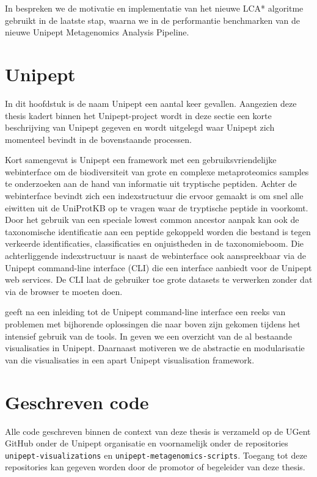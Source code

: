In  bespreken we de motivatie en implementatie van het nieuwe 
LCA* algoritme gebruikt in de laatste stap, waarna we in  
de performantie benchmarken van de nieuwe Unipept Metagenomics Analysis 
Pipeline.

\section{Unipept}
In dit hoofdstuk is de naam Unipept een aantal keer gevallen. Aangezien deze
thesis kadert binnen het Unipept-project wordt in deze sectie een korte
beschrijving van Unipept gegeven en wordt uitgelegd waar Unipept zich momenteel
bevindt in de bovenstaande processen.

Kort samengevat is Unipept een framework met een gebruiksvriendelijke
webinterface om de biodiversiteit van grote en complexe metaproteomics samples
te onderzoeken aan de hand van informatie uit tryptische peptiden. Achter de
webinterface bevindt zich een indexstructuur die ervoor gemaakt is om snel alle
eiwitten uit de UniProtKB op te vragen waar de tryptische peptide in voorkomt.
Door het gebruik van een speciale lowest common ancestor aanpak kan ook de
taxonomische identificatie aan een peptide gekoppeld worden die bestand is tegen
verkeerde identificaties, classificaties en onjuistheden in de taxonomieboom.
Die achterliggende indexstructuur is naast de webinterface ook aanspreekbaar
via de Unipept command-line interface (CLI) die een interface aanbiedt voor de 
Unipept web services. De CLI laat de gebruiker toe grote datasets te verwerken 
zonder dat via de browser te moeten doen.

 geeft na een inleiding tot de Unipept command-line interface een
reeks van problemen met bijhorende oplossingen die naar boven zijn gekomen
tijdens het intensief gebruik van de tools. In  geven we een
overzicht van de al bestaande visualisaties in Unipept. Daarnaast motiveren we
de abstractie en modularisatie van die visualisaties in een apart Unipept
visualisation framework.

\section{Geschreven code}

Alle code geschreven binnen de context van deze thesis is verzameld op de UGent
GitHub onder de Unipept organisatie en voornamelijk onder de repositories
\texttt{unipept-visualizations} en \texttt{unipept-metagenomics-scripts}.
Toegang tot deze repositories kan gegeven worden door de promotor of begeleider
van deze thesis.